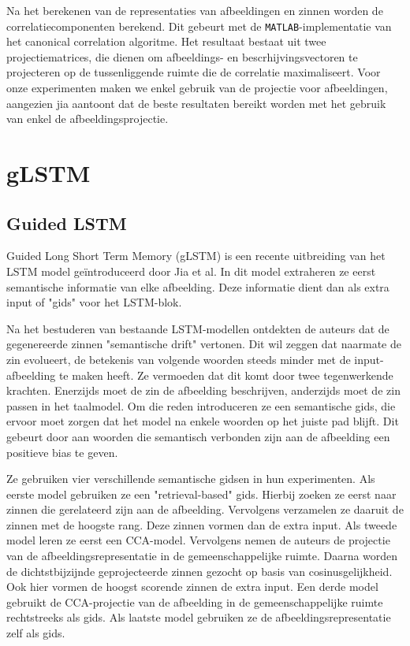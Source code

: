 Na het berekenen van de representaties van afbeeldingen en zinnen worden de correlatiecomponenten berekend. Dit gebeurt met de \texttt{MATLAB}-implementatie van het canonical correlation algoritme. Het resultaat bestaat uit twee projectiematrices, die dienen om afbeeldings- en bescrhijvingsvectoren te projecteren op de tussenliggende ruimte die de correlatie maximaliseert. Voor onze experimenten maken we enkel gebruik van de projectie voor afbeeldingen, aangezien jia  aantoont dat de beste resultaten bereikt worden met het gebruik van enkel de afbeeldingsprojectie.

\section{gLSTM}
\subsection{Guided LSTM}
Guided Long Short Term Memory (gLSTM) is een recente uitbreiding van het LSTM model ge\"introduceerd door Jia et al.  In dit model extraheren ze eerst semantische informatie van elke afbeelding. Deze informatie dient dan als extra input of "gids" voor het LSTM-blok.

Na het bestuderen van bestaande LSTM-modellen ontdekten de auteurs dat de gegenereerde zinnen "semantische drift" vertonen. Dit wil zeggen dat naarmate de zin evolueert, de betekenis van volgende woorden steeds minder met de input-afbeelding te maken heeft. Ze vermoeden dat dit komt door twee tegenwerkende krachten. Enerzijds moet de zin de afbeelding beschrijven, anderzijds moet de zin passen in het taalmodel. Om die reden introduceren ze een semantische gids, die ervoor moet zorgen dat het model na enkele woorden op het juiste pad blijft. Dit gebeurt door aan woorden die semantisch verbonden zijn aan de afbeelding een positieve bias te geven.

Ze gebruiken vier verschillende semantische gidsen in hun experimenten. Als eerste model gebruiken ze een "retrieval-based" gids. Hierbij zoeken ze eerst naar zinnen die gerelateerd zijn aan de afbeelding. Vervolgens verzamelen ze daaruit de zinnen met de hoogste rang. Deze zinnen vormen dan de extra input.
Als tweede model leren ze eerst een CCA-model. Vervolgens nemen de auteurs de projectie van de afbeeldingsrepresentatie in de gemeenschappelijke ruimte. Daarna worden de dichtstbijzijnde geprojecteerde zinnen gezocht op basis van cosinusgelijkheid. Ook hier vormen de hoogst scorende zinnen de extra input.
Een derde model gebruikt de CCA-projectie van de afbeelding in de gemeenschappelijke ruimte rechtstreeks als gids.
Als laatste model gebruiken ze de afbeeldingsrepresentatie zelf als gids.

